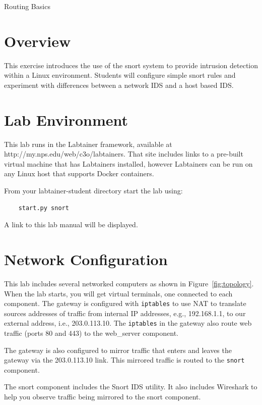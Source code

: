 


\begin{center}
{\LARGE Routing Basics}
\vspace{0.1in}\\
\end{center}

\copyrightnotice

\section{Overview}
This exercise introduces the use of the snort system
to provide intrusion detection within a
Linux environment.  Students will configure simple 
snort rules and experiment with differences between
a network IDS and a host based IDS.  


\section{Lab Environment}
This lab runs in the Labtainer framework,
available at http://my.nps.edu/web/c3o/labtainers.
That site includes links to a pre-built virtual machine
that has Labtainers installed, however Labtainers can
be run on any Linux host that supports Docker containers.

From your labtainer-student directory start the lab using:
\begin{verbatim}
    start.py snort
\end{verbatim}
\noindent A link to this lab manual will be displayed.  

\section{Network Configuration}
This lab includes several networked computers as shown in Figure~\ref{fig:topology}.
When the lab starts, you will get virtual terminals, one connected to each
component.  The gateway is configured with {\tt iptables} to use NAT to translate
sources addresses of traffic from internal IP addresses, e.g., 192.168.1.1, to
our external address, i.e., 203.0.113.10.  The {\tt iptables} in the gateway also
route web traffic (ports 80 and 443) to the web\_server component.

The gateway is also configured to 
mirror traffic that enters and leaves the gateway via the 203.0.113.10 link.  This
mirrored traffic is routed to the {\tt snort} component.  

The snort component includes the Snort IDS utility.  It also includes Wireshark
to help you observe traffic being mirrored to the snort component.

